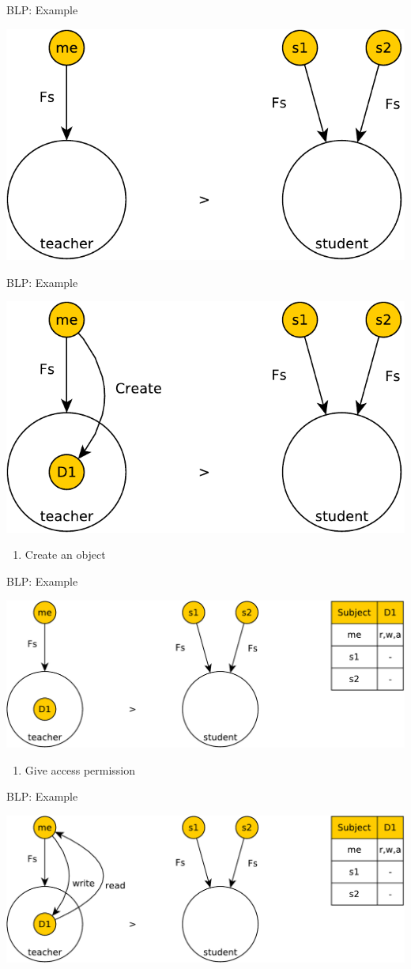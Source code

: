 \documentclass{beamer}
\begin{document}
\begin{frame}[t]{BLP: Example}
  \begin{center}
    \includegraphics[width=0.5\linewidth]{ex1}
  \end{center}
\end{frame}
\begin{frame}[t]{BLP: Example}
  \begin{center}
    \includegraphics[width=0.5\linewidth]{ex2}
  \end{center}
\begin{enumerate}
  \item Create an object
\end{enumerate}
\end{frame}
\begin{frame}[t]{BLP: Example}
  \begin{center}
    \includegraphics[width=0.8\linewidth]{ex3}
  \end{center}
\begin{enumerate}
  \item Give access permission
\end{enumerate}
\end{frame}
\begin{frame}[t]{BLP: Example}
  \begin{center}
    \includegraphics[width=0.8\linewidth]{ex4}
  \end{center}
\end{frame}
\end{document}
